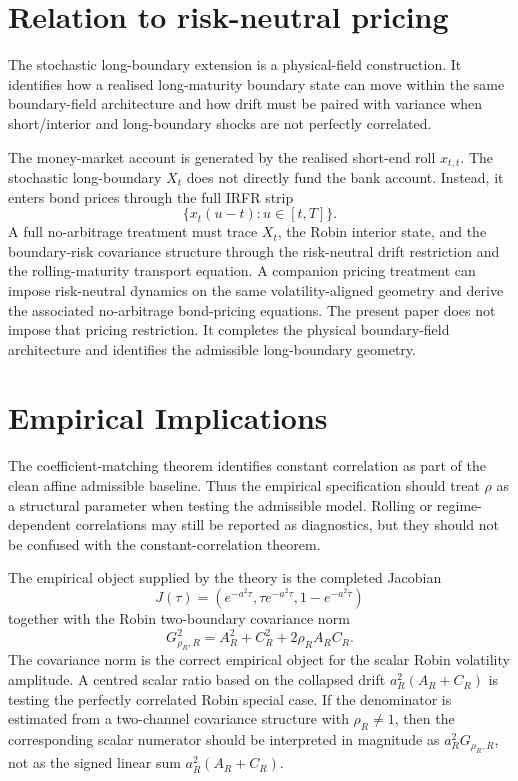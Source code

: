 \documentclass[11pt]{article}
\numberwithin{equation}{section}
\begin{document}
\section{Relation to risk-neutral pricing}

The stochastic long-boundary extension is a physical-field construction. It identifies how a realised long-maturity boundary state can move within the same boundary-field architecture and how drift must be paired with variance when short/interior and long-boundary shocks are not perfectly correlated.

The money-market account is generated by the realised short-end roll \(x_{t,t}\). The stochastic long-boundary \(X_t\) does not directly fund the bank account. Instead, it enters bond prices through the full IRFR strip
\[
\{x_t(u-t):u\in[t,T]\}.
\]
A full no-arbitrage treatment must trace \(X_t\), the Robin interior state, and the boundary-risk covariance structure through the risk-neutral drift restriction and the rolling-maturity transport equation. A companion pricing treatment can impose risk-neutral dynamics on the same volatility-aligned geometry and derive the associated no-arbitrage bond-pricing equations. The present paper does not impose that pricing restriction. It completes the physical boundary-field architecture and identifies the admissible long-boundary geometry.

\section{Empirical Implications}

The coefficient-matching theorem identifies constant correlation as part of the clean affine admissible baseline. Thus the empirical specification should treat \(\rho\) as a structural parameter when testing the admissible model. Rolling or regime-dependent correlations may still be reported as diagnostics, but they should not be confused with the constant-correlation theorem.

The empirical object supplied by the theory is the completed Jacobian
\[
J(\tau)=
\left(
 e^{-a^2\tau},
 \tau e^{-a^2\tau},
 1-e^{-a^2\tau}
\right)
\]
together with the Robin two-boundary covariance norm
\[
G_{\rho_R,R}^2=A_R^2+C_R^2+2\rho_R A_RC_R.
\]
The covariance norm is the correct empirical object for the scalar Robin volatility amplitude. A centred scalar ratio based on the collapsed drift \(a_R^2(A_R+C_R)\) is testing the perfectly correlated Robin special case. If the denominator is estimated from a two-channel covariance structure with \(\rho_R\neq1\), then the corresponding scalar numerator should be interpreted in magnitude as \(a_R^2G_{\rho_R,R}\), not as the signed linear sum \(a_R^2(A_R+C_R)\).
\end{document}
